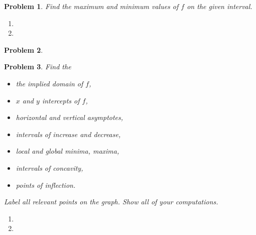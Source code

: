 \documentclass{article}
\renewcommand{\fcProblemRef}{\theproblem.\theenumi}
\newtheorem{problem}{Problem}
\begin{document}


\begin{problem}
Find the maximum and minimum values of $f$ on the given interval. 
\begin{multicols}{2}
\begin{enumerate}[ref={\fcProblemRef}]

\item 
\item 

\end{enumerate}
\end{multicols}
\end{problem}
\begin{problem}

\end{problem}

\begin{problem}
Find the
\begin{multicols}{2}
\begin{itemize}
\item the implied domain of $f$,
\item $x$ and $y$ intercepts of $f$,
\item horizontal and vertical asymptotes,
\item intervals of increase and decrease,
\item local and global minima, maxima,
\item intervals of concavity,
\item points of inflection.
\end{itemize}
\end{multicols}
Label all relevant points on the graph. Show all of your computations.
\begin{enumerate}[ref={\fcProblemRef}]
\item 

\item 

\end{enumerate}
\end{problem}

\end{document}

